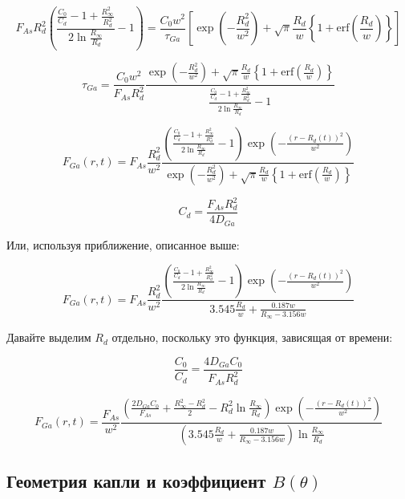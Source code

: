 \documentclass[14pt,oneside]{extarticle}
\begin{document}
\[
F_{As}R_{d}^{2}\left(\frac{\frac{C_{0}}{C_{d}}-1+\frac{R_{\infty}^{2}}{R_{d}^{2}}}{2\ln\frac{R_{\infty}}{R_{d}}}-1\right)=\frac{C_{0}w^{2}}{\tau_{Ga}}\left[\exp\left(-\frac{R_{d}^{2}}{w^{2}}\right)+\sqrt{\pi}\frac{R_{d}}{w}\left\{ 1+\text{erf}\left(\frac{R_{d}}{w}\right)\right\} \right]
\]

\[
\tau_{Ga}=\frac{C_{0}w^{2}}{F_{As}R_{d}^{2}}\frac{\exp\left(-\frac{R_{d}^{2}}{w^{2}}\right)+\sqrt{\pi}\frac{R_{d}}{w}\left\{ 1+\text{erf}\left(\frac{R_{d}}{w}\right)\right\} }{\frac{\frac{C_{0}}{C_{d}}-1+\frac{R_{\infty}^{2}}{R_{d}^{2}}}{2\ln\frac{R_{\infty}}{R_{d}}}-1}
\]

\begin{equation}
    F_{Ga}\left(r,t\right)=F_{As}\frac{R_{d}^{2}}{w^{2}}\frac{\left(\frac{\frac{C_{0}}{C_{d}}-1+\frac{R_{\infty}^{2}}{R_{d}^{2}}}{2\ln\frac{R_{\infty}}{R_{d}}}-1\right)\exp\left(-\frac{\left(r-R_{d}\left(t\right)\right)^{2}}{w^{2}}\right)}{\exp\left(-\frac{R_{d}^{2}}{w^{2}}\right)+\sqrt{\pi}\frac{R_{d}}{w}\left\{ 1+\text{erf}\left(\frac{R_{d}}{w}\right)\right\} }
\end{equation}

\[
C_{d}=\frac{F_{As}R_{d}^{2}}{4D_{Ga}}
\]

Или, используя приближение, описанное выше:

\[
F_{Ga}\left(r,t\right)=F_{As}\frac{R_{d}^{2}}{w^{2}}\frac{\left(\frac{\frac{C_{0}}{C_{d}}-1+\frac{R_{\infty}^{2}}{R_{d}^{2}}}{2\ln\frac{R_{\infty}}{R_{d}}}-1\right)\exp\left(-\frac{\left(r-R_{d}\left(t\right)\right)^{2}}{w^{2}}\right)}{3.545\frac{R_{d}}{w}+\frac{0.187w}{R_{\infty}-3.156w}}
\]

Давайте выделим $R_{d}$ отдельно, поскольку это функция, зависящая от времени:

\[
\frac{C_{0}}{C_{d}}=\frac{4D_{Ga}C_{0}}{F_{As}R_{d}^{2}}
\]

\begin{equation}
    F_{Ga}\left(r,t\right)=\frac{F_{As}}{w^{2}}\frac{\left(\frac{2D_{Ga}C_{0}}{F_{As}}+\frac{R_{\infty}^{2}-R_{d}^{2}}{2}-R_{d}^{2}\ln\frac{R_{\infty}}{R_{d}}\right)\exp\left(-\frac{\left(r-R_{d}\left(t\right)\right)^{2}}{w^{2}}\right)}{\left(3.545\frac{R_{d}}{w}+\frac{0.187w}{R_{\infty}-3.156w}\right)\ln\frac{R_{\infty}}{R_{d}}}
\end{equation}

\subsection{Геометрия капли и коэффициент $B(\theta)$}
\end{document}
